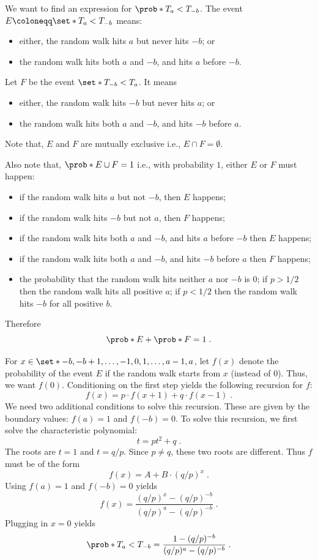 \newpage
We want to find an expression for $\prob*{T_a<T_{-b}}$. The event 
$E\coloneqq\set*{T_a<T_{-b}}$ means:
\begin{itemize}
\item either, the random walk hits $a$ but never hits $-b$; or
\item the random walk hits both $a$ and $-b$, and hits $a$ before $-b$.
\end{itemize}

Let $F$ be the event $\set*{T_{-b}<T_a}$. It means
\begin{itemize}
\item either, the random walk hits $-b$ but never hits $a$; or
\item the random walk hits both $a$ and $-b$, and hits $-b$ before $a$.
\end{itemize}

Note that, $E$ and $F$ are mutually exclusive i.e., $E\cap F=\emptyset$.

Also note that, $\prob*{E\cup F}=1$ i.e., with probability $1$, either $E$ or $F$ must happen:
\begin{itemize}
    \item if the random walk hits $a$ but not $-b$, then $E$ happens;
    \item if the random walk hits $-b$ but not $a$, then $F$ happens;
    \item if the random walk hits both $a$ and $-b$, and hits $a$ before $-b$ then $E$ happens;
    \item if the random walk hits both $a$ and $-b$, and hits $-b$ before $a$ then $F$ happens;
    \item the probability that the random walk hits neither $a$ nor $-b$ is $0$; if $p>1/2$ then the random walk hits all positive $a$; if $p<1/2$ then the random walk hits $-b$ for all positive $b$.
\end{itemize}

Therefore 
\[
\prob*{E} + \prob*{F} = 1\;.
\]

For $x\in\set*{-b,-b+1,\ldots,-1,0,1,\ldots,a-1,a}$, let $f(x)$ denote the probability of the event $E$ if the random walk starts from $x$ (instead of $0$). Thus, we want $f(0)$. Conditioning on the first step yields the following recursion for $f$:
\[
f(x) = p \cdot f(x+1) + q \cdot f(x-1)\;.
\]
We need two additional conditions to solve this recursion. These are given by
the boundary values: $f(a)=1$ and $f(-b)=0$. To solve this recursion, we first solve the characteristic polynomial:
\[
t = p t^2 + q\;.
\]
The roots are $t=1$ and $t=q/p$. Since $p\neq q$, these two roots are different. Thus $f$ must be of the form
\[
f(x) = A + B \cdot (q/p)^x \;.
\]
Using $f(a)=1$ and $f(-b)=0$ yields
\[
f(x) = \frac{(q/p)^x-(q/p)^{-b}}{(q/p)^a-(q/p)^{-b}}\;.
\]
Plugging in $x=0$ yields
\begin{equation}\label{eq:assrw.main}
\prob*{T_a<T_{-b}} = \frac{1-(q/p)^{-b}}{(q/p)^a-(q/p)^{-b}}\;.
\end{equation}
\newpage

